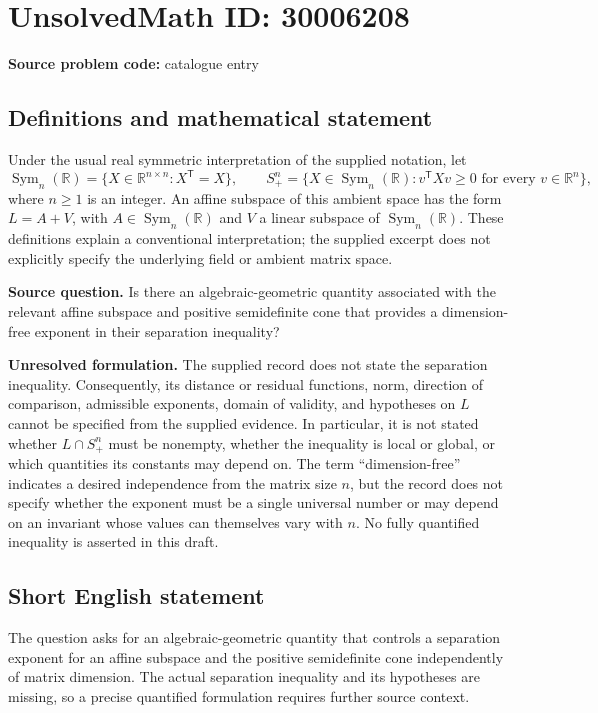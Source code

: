 \documentclass[11pt]{article}
\newcommand{\R}{\mathbb{R}}
\begin{document}
\section*{UnsolvedMath ID: 30006208}
\textbf{Source problem code:} catalogue entry
\subsection{Definitions and mathematical statement}
Under the usual real symmetric interpretation of the supplied notation, let
\[
\operatorname{Sym}_n(\R)=\{X\in\R^{n\times n}:X^{\mathsf T}=X\},\qquad
S_+^n=\{X\in\operatorname{Sym}_n(\R):v^{\mathsf T}Xv\geq 0\text{ for every }v\in\R^n\},
\]
where \(n\geq 1\) is an integer. An affine subspace of this ambient space has the form \(L=A+V\), with \(A\in\operatorname{Sym}_n(\R)\) and \(V\) a linear subspace of \(\operatorname{Sym}_n(\R)\). These definitions explain a conventional interpretation; the supplied excerpt does not explicitly specify the underlying field or ambient matrix space.

\textbf{Source question.} Is there an algebraic-geometric quantity associated with the relevant affine subspace and positive semidefinite cone that provides a dimension-free exponent in their separation inequality?

\textbf{Unresolved formulation.} The supplied record does not state the separation inequality. Consequently, its distance or residual functions, norm, direction of comparison, admissible exponents, domain of validity, and hypotheses on \(L\) cannot be specified from the supplied evidence. In particular, it is not stated whether \(L\cap S_+^n\) must be nonempty, whether the inequality is local or global, or which quantities its constants may depend on. The term ``dimension-free'' indicates a desired independence from the matrix size \(n\), but the record does not specify whether the exponent must be a single universal number or may depend on an invariant whose values can themselves vary with \(n\). No fully quantified inequality is asserted in this draft.
\subsection{Short English statement}
The question asks for an algebraic-geometric quantity that controls a separation exponent for an affine subspace and the positive semidefinite cone independently of matrix dimension. The actual separation inequality and its hypotheses are missing, so a precise quantified formulation requires further source context.
\end{document}
